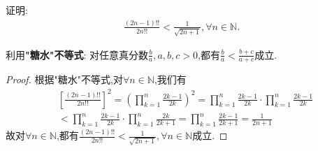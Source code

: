 \documentclass[../../main.tex]{subfiles}%
\begin{document}
\begin{example}
证明:\begin{align*}
\frac{\left( 2n-1 \right) !!}{2n!!}<\frac{1}{\sqrt{2n+1}},\forall n\in \mathbb{N} .
\end{align*}
\end{example}
\begin{note}
利用\hypertarget{"糖水"不等式}{\textbf{"糖水"不等式}}:
对任意真分数$\frac{b}{a},a,b,c>0$,都有$\frac{b}{a}<\frac{b+c}{a+c}$成立.
\end{note}
\begin{proof}

根据\hypertarget{"糖水"不等式}{"糖水"不等式},对$\forall n\in \mathbb{N}$,我们有
\begin{align*}
&\left[ \frac{\left( 2n-1 \right) !!}{2n!!} \right] ^2=\left( \prod_{k=1}^n{\frac{2k-1}{2k}} \right) ^2=\prod_{k=1}^n{\frac{2k-1}{2k}}\cdot \prod_{k=1}^n{\frac{2k-1}{2k}}
\\
&<\prod_{k=1}^n{\frac{2k-1}{2k}}\cdot \prod_{k=1}^n{\frac{2k}{2k+1}}=\prod_{k=1}^n{\frac{2k-1}{2k+1}}=\frac{1}{2n+1}
\end{align*}
故对$\forall n\in \mathbb{N}$,都有$\frac{\left( 2n-1 \right) !!}{2n!!}<\frac{1}{\sqrt{2n+1}},\forall n\in \mathbb{N}$成立.

\end{proof}
\end{document}
